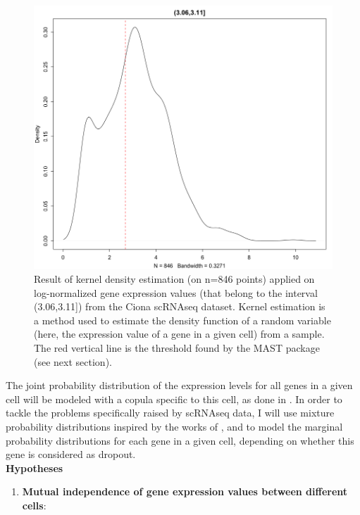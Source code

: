\documentclass{report}
\begin{document}
{\begin{figure}[H]
\centering
\includegraphics[scale=0.35]{illustrations/densityCionaLogNorm.png}
\caption{Result of kernel density estimation\cite{parzen1962estimation} (on n=846 points) applied on log-normalized gene expression values (that belong to the interval (3.06,3.11]) from the Ciona\cite{suyama2016singlecell} scRNAseq dataset. Kernel estimation is a method used to estimate the density function of a random variable (here, the expression value of a gene in a given cell) from a sample. The red vertical line is the threshold found by the MAST package (see next section).}
\label{densityCiona}
\end{figure}

The joint probability distribution of the expression levels for all genes in a given cell will be modeled with a copula specific to this cell, as done in \cite{zhang2017classification}. In order to tackle the problems specifically raised by scRNAseq data, I will use mixture probability distributions inspired by the works of \cite{kharchenko2014bayesian}, and \cite{finak2015mast} to model the marginal probability distributions for each gene in a given cell, depending on whether this gene is considered as dropout.\\

\bigskip
\noindent \textbf{Hypotheses}
\bigskip

\begin{enumerate}
\item \textbf{Mutual independence of gene expression values between different cells}:\\


\end{enumerate}}
\end{document}
